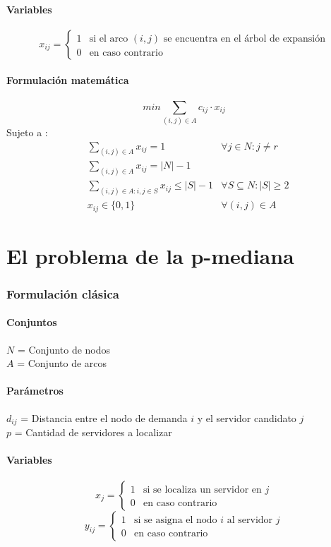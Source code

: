 \documentclass{article}
\numberwithin{equation}{section}
\begin{document}
\subsection{Variables}
\begin{flushleft}
\[x_{ij}={\begin{cases}1&{\mbox{si el arco $(i,j)$ se encuentra en el árbol de expansión}}\\0&{\mbox{en caso contrario}}\end{cases}}
\]
\end{flushleft}
\subsection{Formulación matemática}
\begin{equation}
min \sum_{(i,j) \in A} c_{ij} \cdot x_{ij}
\end{equation}
Sujeto a : \begin{align}
& \sum_{(i,j) \in A} x_{ij} = 1 &\forall j \in N: j \neq r\\
& \sum_{(i,j) \in A} x_{ij} = |N| - 1\\
& \sum_{(i,j) \in A: i,j \in S} x_{ij} \leq |S| - 1 &\forall S \subseteq N : |S| \geq 2 \\
& x_{ij} \in \{0,1\} &\forall (i,j) \in A
\end{align}






\newpage
\part{El problema de la p-mediana}
\section{Formulación clásica}
\subsection{Conjuntos}
$N$ = Conjunto de nodos\\
$A$ = Conjunto de arcos
\subsection{Parámetros}
$d_{ij}$ = Distancia entre el nodo de demanda $i$ y el servidor candidato $j$\\
$p$ = Cantidad de servidores a localizar
\subsection{Variables}
\begin{center}
\[x_{j}={\begin{cases}1&{\mbox{si se localiza un servidor en $j$}}\\0&{\mbox{en caso contrario}}\end{cases}}
\]
\[y_{ij}={\begin{cases}1&{\mbox{si se asigna el nodo $i$ al servidor $j$}}\\0&{\mbox{en caso contrario}}\end{cases}}
\]
\end{center}
\end{document}
